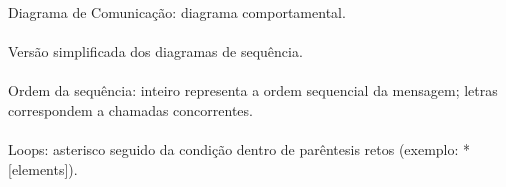 \documentclass[../resumosLPOO.tex]{subfiles}
\begin{document}
 

Diagrama de Comunicação: diagrama comportamental.

\paragraph{}

Versão simplificada dos diagramas de sequência.

\paragraph{}

Ordem da sequência: inteiro representa a ordem sequencial da mensagem; letras correspondem a chamadas concorrentes.

\paragraph{}

Loops: asterisco seguido da condição dentro de parêntesis retos (exemplo: *[elements]).
\end{document}
